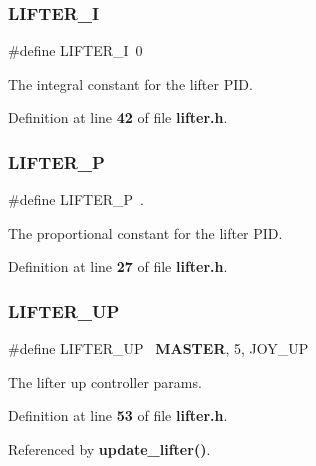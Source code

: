 \subsubsection{L\+I\+F\+T\+E\+R\+\_\+I}
{\footnotesize\ttfamily \#define L\+I\+F\+T\+E\+R\+\_\+I~0}



The integral constant for the lifter P\+ID. 



Definition at line \textbf{ 42} of file \textbf{ lifter.\+h}.

\mbox{\label{lifter_8h_ae5623433650815b810d784e0da176e3c}} 
\subsubsection{L\+I\+F\+T\+E\+R\+\_\+P}
{\footnotesize\ttfamily \#define L\+I\+F\+T\+E\+R\+\_\+P~.}



The proportional constant for the lifter P\+ID. 



Definition at line \textbf{ 27} of file \textbf{ lifter.\+h}.

\mbox{\label{lifter_8h_a96a5c0bbb7527bf1d45818fc4db97b68}} 
\subsubsection{L\+I\+F\+T\+E\+R\+\_\+\+UP}
{\footnotesize\ttfamily \#define L\+I\+F\+T\+E\+R\+\_\+\+UP~\textbf{ M\+A\+S\+T\+ER}, 5, J\+O\+Y\+\_\+\+UP}



The lifter up controller params. 



Definition at line \textbf{ 53} of file \textbf{ lifter.\+h}.



Referenced by \textbf{ update\+\_\+lifter()}.

\mbox{\label{lifter_8h_adbb0a4048f612d2042be2b1d2644a16e}} 
